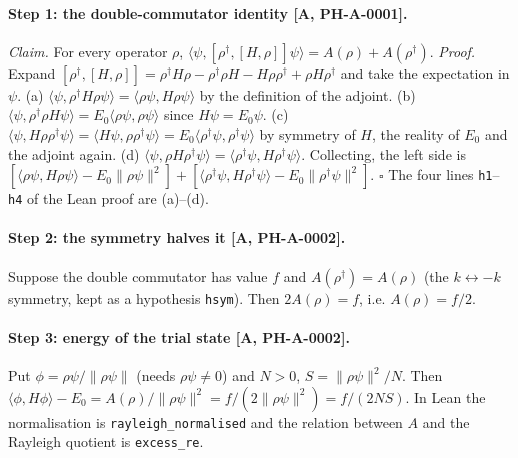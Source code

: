 \documentclass[11pt]{article}
\theoremstyle{remark}
\newcommand{\tier}[1]{\textsf{[#1]}}
\newcommand{\lean}[1]{\texttt{#1}}
\newcommand{\ip}[2]{\langle #1,#2\rangle}
\begin{document}
\paragraph{Step 1: the double-commutator identity \tier{A, PH-A-0001}.} \emph{Claim.} For every operator $\rho$,
$\ip{\psi}{[\rho^\dagger,[H,\rho]]\psi}=A(\rho)+A(\rho^\dagger)$.
\emph{Proof.} Expand $[\rho^\dagger,[H,\rho]]=\rho^\dagger H\rho-\rho^\dagger\rho H-H\rho\rho^\dagger+\rho H\rho^\dagger$ and take the
expectation in $\psi$. (a) $\ip{\psi}{\rho^\dagger H\rho\psi}=\ip{\rho\psi}{H\rho\psi}$ by the definition of the adjoint.
(b) $\ip{\psi}{\rho^\dagger\rho H\psi}=E_0\ip{\rho\psi}{\rho\psi}$ since $H\psi=E_0\psi$. (c) $\ip{\psi}{H\rho\rho^\dagger\psi}=\ip{H\psi}{\rho\rho^\dagger\psi}=E_0\ip{\rho^\dagger\psi}{\rho^\dagger\psi}$
by symmetry of $H$, the reality of $E_0$ and the adjoint again. (d) $\ip{\psi}{\rho H\rho^\dagger\psi}=\ip{\rho^\dagger\psi}{H\rho^\dagger\psi}$.
Collecting, the left side is $[\ip{\rho\psi}{H\rho\psi}-E_0\|\rho\psi\|^2]+[\ip{\rho^\dagger\psi}{H\rho^\dagger\psi}-E_0\|\rho^\dagger\psi\|^2]$. $\square$
The four lines \lean{h1}--\lean{h4} of the Lean proof are (a)--(d).


\paragraph{Step 2: the symmetry halves it \tier{A, PH-A-0002}.} Suppose the double commutator has value $f$ and $A(\rho^\dagger)=A(\rho)$ (the
$k\leftrightarrow-k$ symmetry, kept as a hypothesis \lean{hsym}). Then $2A(\rho)=f$, i.e. $A(\rho)=f/2$.


\paragraph{Step 3: energy of the trial state \tier{A, PH-A-0002}.} Put $\phi=\rho\psi/\|\rho\psi\|$ (needs $\rho\psi\ne0$) and $N>0$,
$S=\|\rho\psi\|^2/N$. Then $\ip{\phi}{H\phi}-E_0=A(\rho)/\|\rho\psi\|^2=f/(2\|\rho\psi\|^2)=f/(2NS)$. In Lean the normalisation is
\lean{rayleigh\_normalised} and the relation between $A$ and the Rayleigh quotient is \lean{excess\_re}.

\end{document}
